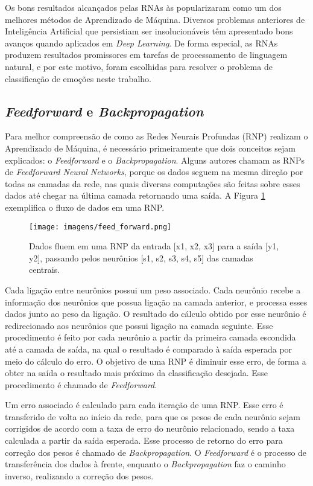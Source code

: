\documentclass[
12pt,       %
openright,      %
oneside,      %
a4paper,      %
english,      %
french,       %
spanish,      %
brazil        %
]{abntex2}
\begin{document}
Os bons resultados alcançados pelas RNAs às popularizaram como um dos melhores métodos de Aprendizado de Máquina. Diversos problemas anteriores de Inteligência Artificial que persistiam ser insolucionáveis têm apresentado bons avanços quando aplicados em \textit{Deep Learning}. De forma especial, as RNAs produzem resultados promissores em tarefas de processamento de linguagem natural, e por este motivo, foram escolhidas para resolver o problema de classificação de emoções neste trabalho.

\subsection{\textit{Feedforward} e \textit{Backpropagation}} \label{feed_back}

Para melhor compreensão de como as Redes Neurais Profundas (RNP) realizam o Aprendizado de Máquina, é necessário primeiramente que dois conceitos sejam explicados: o \textit{Feedforward} e o \textit{Backpropagation}. Alguns autores chamam as RNPs de \textit{Feedforward Neural Networks}, porque os dados seguem na mesma direção por todas as camadas da rede, nas quais diversas computações são feitas sobre esses dados até chegar na última camada retornando uma saída. A Figura \ref{fig:feed_forward} exemplifica o fluxo de dados em uma RNP.

\begin{figure}[ht]
\centering
\caption{Dados fluem em uma RNP da entrada [x1, x2, x3] para a saída [y1, y2], passando pelos neurônios [s1, s2, s3, s4, s5] das camadas centrais.}
\texttt{[image: imagens/feed\_forward.png]}
\label{fig:feed_forward}
\end{figure}

Cada ligação entre neurônios possui um peso associado. Cada neurônio recebe a informação dos neurônios que possua ligação na camada anterior, e processa esses dados junto ao peso da ligação. O resultado do cálculo obtido por esse neurônio é redirecionado aos neurônios que possui ligação na camada seguinte. Esse procedimento é feito por cada neurônio a partir da primeira camada escondida até a camada de saída, na qual o resultado é comparado à saída esperada por meio do cálculo do erro. O objetivo de uma RNP é diminuir esse erro, de forma a obter na saída o resultado mais próximo da classificação desejada. Esse procedimento é chamado de \textit{Feedforward}.

Um erro associado é calculado para cada iteração de uma RNP. Esse erro é transferido de volta ao início da rede, para que os pesos de cada neurônio sejam corrigidos de acordo com a taxa de erro do neurônio relacionado, sendo a taxa calculada a partir da saída esperada. Esse processo de retorno do erro para correção dos pesos é chamado de \textit{Backpropagation}. O \textit{Feedforward} é o processo de transferência dos dados à frente, enquanto o \textit{Backpropagation} faz o caminho inverso, realizando a correção dos pesos.
\end{document}
